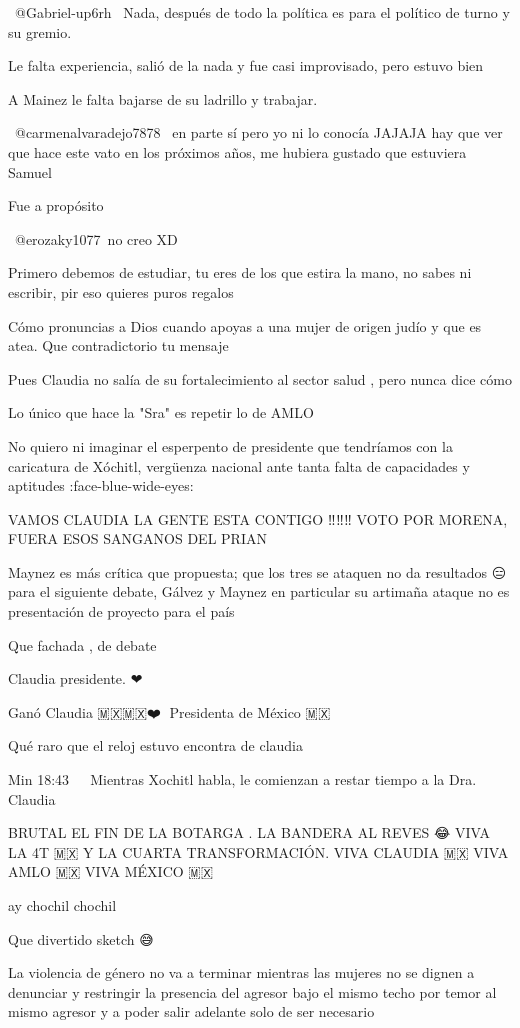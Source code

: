  @Gabriel-up6rh  Nada, después de todo la política es para el político de turno y su gremio.

Le falta experiencia, salió de la nada y fue casi improvisado, pero estuvo bien

A Mainez le falta bajarse de su ladrillo y trabajar.

 @carmenalvaradejo7878  en parte sí pero yo ni lo conocía JAJAJA hay que ver que hace este vato en los próximos años, me hubiera gustado que estuviera Samuel

Fue a propósito

 @erozaky1077 no creo XD

Primero debemos de estudiar, tu eres de los que estira la mano, no sabes ni escribir, pir eso quieres puros regalos

Cómo pronuncias a Dios cuando apoyas a una mujer de origen judío y que es atea. Que contradictorio tu mensaje

Pues Claudia no salía de su fortalecimiento al sector salud , pero nunca dice cómo

Lo único que hace la "Sra" es repetir lo de AMLO

No quiero ni imaginar el esperpento de presidente que tendríamos con la caricatura de Xóchitl, vergüenza nacional ante tanta falta de capacidades y aptitudes  :face-blue-wide-eyes:

VAMOS  CLAUDIA LA GENTE ESTA CONTIGO ‼️‼️‼️ VOTO POR MORENA, FUERA ESOS SANGANOS DEL PRIAN

Maynez es más crítica que propuesta; que los tres se ataquen no da resultados 😑 para el siguiente debate, Gálvez y Maynez en particular su artimaña ataque no es presentación de proyecto para el país 🤷🏼‍♀️

Que fachada , de debate

Claudia presidente. ❤🌹🇲🇽

Ganó Claudia 🇲🇽🇲🇽❤️🙏  Presidenta de México 🇲🇽

Qué raro que el reloj estuvo encontra de claudia

Min 18:43 🤬🤬🤬
Mientras Xochitl habla, le comienzan a restar tiempo a la Dra. Claudia 🤬

BRUTAL EL  FIN DE LA BOTARGA . LA BANDERA AL REVES 😂 
VIVA LA 4T 🇲🇽 Y LA CUARTA TRANSFORMACIÓN.
VIVA CLAUDIA 🇲🇽 
VIVA AMLO 🇲🇽 
VIVA MÉXICO 🇲🇽

ay chochil chochil

Que divertido sketch 😅

La violencia de género no va a terminar mientras las mujeres no se dignen a denunciar y  restringir la presencia del agresor bajo el mismo techo por temor al mismo agresor y a poder salir adelante solo de ser necesario

